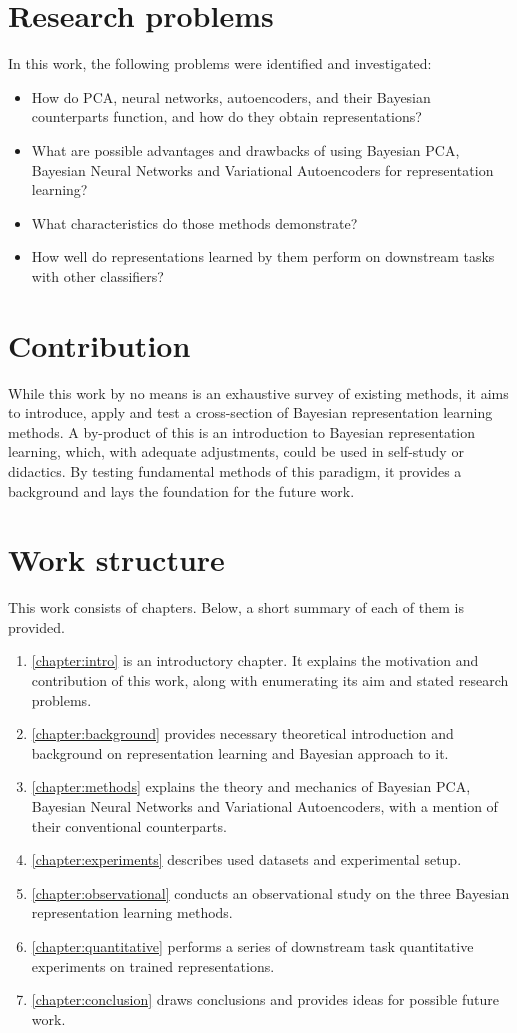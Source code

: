 \section{Research problems}
In this work, the following problems were identified and investigated:
\begin{itemize}
    \item How do PCA, neural networks, autoencoders, and their Bayesian counterparts function, and how do they obtain representations?
    \item What are possible advantages and drawbacks of using Bayesian PCA, Bayesian Neural Networks and Variational Autoencoders for representation learning?
    \item What characteristics do those methods demonstrate?
    \item How well do representations learned by them perform on downstream tasks with other classifiers?
\end{itemize}

\section{Contribution}
While this work by no means is an exhaustive survey of existing methods, it aims to introduce, apply and test a cross-section of Bayesian representation learning methods. A by-product of this is an introduction to Bayesian representation learning, which, with adequate adjustments, could be used in self-study or didactics. By testing fundamental methods of this paradigm, it provides a background and lays the foundation for the future work.


\section{Work structure}
This work consists of  chapters. Below, a short summary of each of them is provided.

\begin{enumerate}
    \item \autoref{chapter:intro} is an introductory chapter. It explains the motivation and contribution of this work, along with enumerating its aim and stated research problems.
    \item \autoref{chapter:background} provides necessary theoretical introduction and background on representation learning and Bayesian approach to it.
    \item \autoref{chapter:methods} explains the theory and mechanics of Bayesian PCA, Bayesian Neural Networks and Variational Autoencoders, with a mention of their conventional counterparts. 
    \item \autoref{chapter:experiments} describes used datasets and experimental setup.
    \item \autoref{chapter:observational} conducts an observational study on the three Bayesian representation learning methods.
    \item \autoref{chapter:quantitative} performs a series of downstream task quantitative experiments on trained representations.
    \item \autoref{chapter:conclusion} draws conclusions and provides ideas for possible future work.
\end{enumerate}